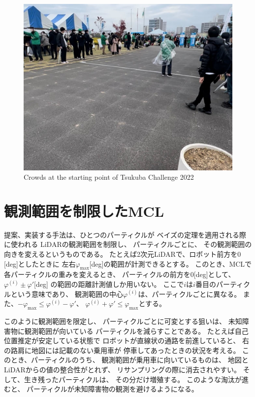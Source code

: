 \documentclass{jarticle}
\begin{document}
\begin{figure}[bth]
  \centering
	\includegraphics[width=0.8\linewidth]{fig/hitogomi.png}
   \caption{Crowds at the starting point of Tsukuba Challenge 2022}
   \label{fig:つくばチャレンジ人混み}
 \end{figure}

\section{観測範囲を制限したMCL}%

提案、実装する手法は、ひとつのパーティクルが
ベイズの定理を適用される際に使われる
LiDARの観測範囲を制限し、
パーティクルごとに、
その観測範囲の向きを変えるというものである。
たとえば2次元LiDARで、ロボット前方を$0$[deg]としたときに
左右$\varphi_\text{max}$[deg]の範囲が計測できるとする。
このとき、MCLで各パーティクルの重みを変えるとき、
パーティクルの前方を$0$[deg]として、
$\varphi^{(i)} \pm \varphi'$[deg]
の範囲の距離計測値しか用いない。
ここで$i$は$i$番目のパーティクルという意味であり、
観測範囲の中心$\varphi^{(i)}$は、パーティクルごとに異なる。
また、$ -\varphi_\text{max} \le \varphi^{(i)}-\varphi'$、
$\varphi^{(i)}+\varphi' \le \varphi_\text{max}$とする。

このように観測範囲を限定し、
パーティクルごとに可変とする狙いは、
未知障害物に観測範囲が向いている
パーティクルを減らすことである。
たとえば自己位置推定が安定している状態で
ロボットが直線状の通路を前進していると、
右の路肩に地図には記載のない乗用車が
停車してあったときの状況を考える。
このとき、パーティクルのうち、
観測範囲が乗用車に向いているものは、
地図とLiDARからの値の整合性がとれず、
リサンプリングの際に消去されやすい。
そして、生き残ったパーティクルは、
その分だけ増殖する。
このような淘汰が進むと、
パーティクルが未知障害物の観測を避けるようになる。
\end{document}
